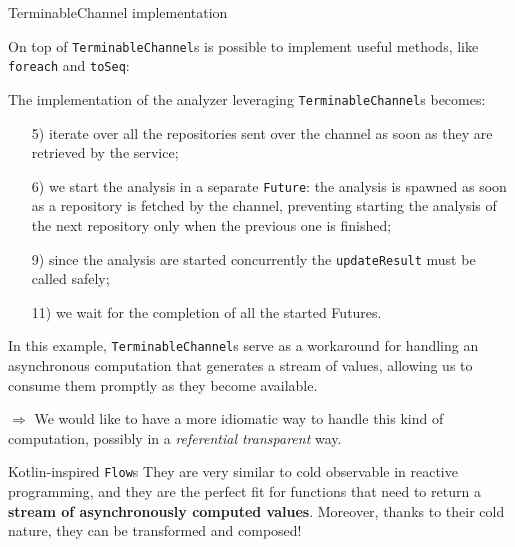 \documentclass[aspectratio=1610,xcolor=dvipsnames,handout]{beamer}
\begin{document}
%
\begin{frame}{TerminableChannel implementation}
  
\end{frame}
%
\begin{frame}
  
\end{frame}
%
\begin{frame}
  \small
  On top of \texttt{TerminableChannel}s is possible to implement useful methods, like \texttt{foreach} and \texttt{toSeq}:
  
\end{frame}
%
\begin{frame}
  \small
  The implementation of the analyzer leveraging \texttt{TerminableChannel}s becomes:
  
  \footnotesize
  \begin{enumerate}
      \item[5)] iterate over all the repositories sent over the channel as soon as they are retrieved by the service;
      \item[6)] we start the analysis in a separate \texttt{Future}: the analysis is spawned as soon as a repository is fetched by the channel, preventing starting the analysis of the next repository only when the previous one is finished;
      \item[9)] since the analysis are started concurrently the \texttt{updateResult} must be called safely;
      \item[11)] we wait for the completion of all the started Futures.
  \end{enumerate}
\end{frame}
%
\begin{frame}
  In this example, \texttt{TerminableChannel}s serve as a workaround for handling an asynchronous computation that generates a stream of values, allowing us to consume them promptly as they become available.
  
  \vspace*{0.5cm}
  $\Rightarrow$ We would like to have a more idiomatic way to handle this kind of computation, possibly in a \textit{referential transparent} way.

  \begin{block}{Kotlin-inspired \texttt{Flow}s}
    They are very similar to cold observable in reactive programming, and they are the perfect fit for functions that need to return a \textbf{stream of asynchronously computed values}. Moreover, thanks to their cold nature, they can be transformed and composed!
  \end{block}
\end{frame}
\end{document}
